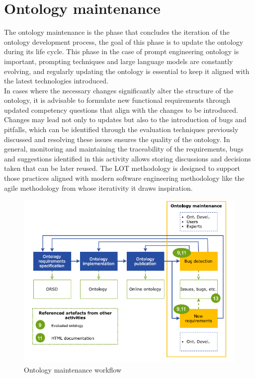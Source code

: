 \newpage
\section{Ontology maintenance}
The ontology maintenance is the phase that concludes the iteration of the ontology development process, the goal of this phase is to update the ontology during its life cycle. This phase in the case of prompt engineering ontology is important, prompting techniques and large language models are constantly evolving, and regularly updating the ontology is essential to keep it aligned with the latest technologies introduced.\\
In cases where the necessary changes significantly alter the structure of the ontology, it is advisable to formulate new functional requirements through updated competency questions that align with the changes to be introduced. Changes may lead not only to updates but also to the introduction of bugs and pitfalls, which can be identified through the evaluation techniques previously discussed and resolving these issues ensures the quality of the ontology. In general, monitoring and maintaining the traceability of the requirements, bugs and suggestions identified in this activity allows storing discussions and decisions taken that can be later reused. The LOT methodology is designed to support those practices aligned with modern software engineering methodology like the agile methodology from whose iterativity it draws inspiration.

\begin{figure}[H]
    \centering
    \includegraphics[width=0.9\linewidth]{Figures/fig_33.png}
    \caption{Ontology maintenance workflow}
    \label{fig:enter-label}
\end{figure}








